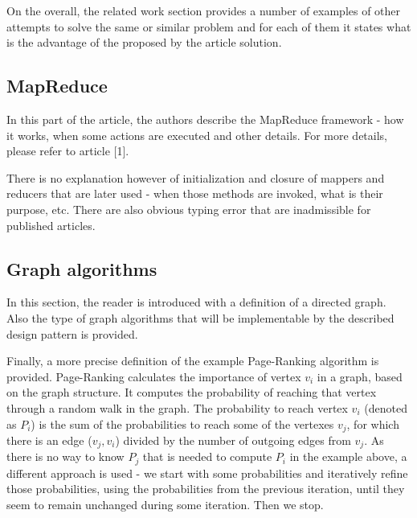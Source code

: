 \documentclass[12pt]{article}
\theoremstyle{plain}
\begin{document}
  On the overall, the related work section provides a number of examples of 
  other attempts to solve the same or similar problem and for each of them it
  states what is the advantage of the proposed by the article solution.

\subsection{MapReduce} %
\label{sub:MapReduce}
  In this part of the article, the authors describe the MapReduce framework -
  how it works, when some actions are executed and other details. For more
  details, please refer to article [1].
  
  There is no explanation however of initialization and closure of mappers and
  reducers that are later used - when those methods are invoked, what is their 
  purpose, etc. There are also obvious typing error that are inadmissible for
  published articles.  

\subsection{Graph algorithms} %
\label{sub:Graph algorithms}
  In this section, the reader is introduced with a definition of a directed
  graph. Also the type of graph algorithms that will be implementable by the
  described design pattern is provided.

  Finally, a more precise definition of the example Page-Ranking algorithm is 
  provided. Page-Ranking calculates the importance of vertex $v_i$ in a graph,
  based on the graph structure. It computes the probability of reaching that 
  vertex through a random walk in the graph. The probability to reach vertex
  $v_i$ (denoted as $P_i$) is the sum of the probabilities to reach some of 
  the vertexes $v_j$, for which there is an edge ($v_j, v_i$) divided by the 
  number of outgoing edges from $v_j$. As there is no way to know $P_j$ that is
  needed to compute $P_i$ in the example above, a different approach is used - 
  we start with some probabilities and iteratively refine those probabilities,
  using the probabilities from the previous iteration, until they seem to
  remain unchanged during some iteration. Then we stop.

\end{document}
